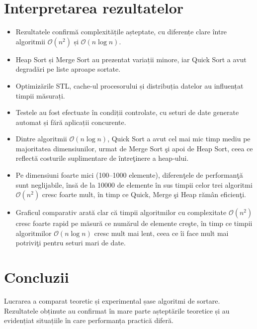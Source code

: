 \documentclass{article}
\begin{document}
\section{Interpretarea rezultatelor}
\begin{itemize}
    \item Rezultatele confirmă complexitățile așteptate, cu diferențe clare între algoritmii $\mathcal{O}(n^2)$ și $\mathcal{O}(n\log n)$.
    \item Heap Sort și Merge Sort au prezentat variații minore, iar Quick Sort a avut degradări pe liste aproape sortate.
    \item Optimizările STL, cache-ul procesorului și distribuția datelor au influențat timpii măsurați.
    \item Testele au fost efectuate în condiții controlate, cu seturi de date generate automat și fără aplicații concurente.
    \item Dintre algoritmii $\mathcal{O}(n\log n)$, Quick Sort a avut cel mai mic timp mediu pe majoritatea dimensiunilor, urmat de Merge Sort şi apoi de Heap Sort, ceea ce reflectă costurile suplimentare de întreţinere a heap‑ului.
    \item Pe dimensiuni foarte mici (100–1000 elemente), diferenţele de performanţă sunt neglijabile, însă de la 10000 de elemente în sus timpii celor trei algoritmi $\mathcal{O}(n^2)$ cresc foarte mult, în timp ce Quick, Merge şi Heap rămân eficienţi.
    \item Graficul comparativ arată clar că timpii algoritmilor cu complexitate $\mathcal{O}(n^2)$ cresc foarte rapid pe măsură ce numărul de elemente creşte, în timp ce timpii algoritmilor $\mathcal{O}(n\log n)$ cresc mult mai lent, ceea ce îi face mult mai potriviţi pentru seturi mari de date.
\end{itemize}


\section{Concluzii}
Lucrarea a comparat teoretic și experimental șase algoritmi de sortare. Rezultatele obținute au confirmat în mare parte așteptările teoretice și au evidențiat situațiile în care performanța practică diferă.
\end{document}
